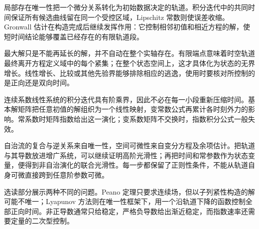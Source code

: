 \begin{chaptersummary}
局部存在唯一性把一个微分关系转化为初始数据决定的轨道。积分迭代中的共同时间保证所有候选曲线留在同一个受控区域，Lipschitz 常数则使误差收缩。Gronwall 估计在构造完成后继续发挥作用：它控制相邻初值和相近方程的解，使短时间结论能够覆盖已经存在的有限轨道段。

\ProseParagraphBreak

最大解只是不能再延长的解，并不自动在整个实轴存在。有限端点意味着时空轨道最终离开方程定义域中的每个紧集；在整个状态空间上，这才具体化为状态的无界增长。线性增长、比较或其他先验界能够排除相应的逃逸，使用时要核对所控制的是正向还是双向时间。

\ProseParagraphBreak

连续系数线性系统的积分迭代具有阶乘界，因此不必在每一小段重新压缩时间。基本解矩阵把任意初值的解组织为一个线性映射，变常数公式再累计各时刻外力的影响。常系数时矩阵指数给出这一演化；变系数矩阵不交换时，指数积分公式一般失效。

\ProseParagraphBreak

自治流的复合与逆关系来自唯一性，空间可微性来自变分方程及余项估计。把轨道与其导数放进增广系统，可以继续证明高阶光滑性；再把时间和常参数作为状态变量，便得到非自治演化的联合光滑性。每一步都保留了正则性条件，不能从轨道自身可微直接跨到任意阶参数可微。

\ProseParagraphBreak

选读部分展示两种不同的问题。Peano 定理只要求连续场，但以子列紧性构造的解可能不唯一；Lyapunov 方法则在唯一性框架下，用一个沿轨道下降的函数控制全部正向时间。非正导数通常只给稳定，严格负导数给出渐近稳定，而指数速率还需要定量的二次型控制。
\end{chaptersummary}

\BookExercises


